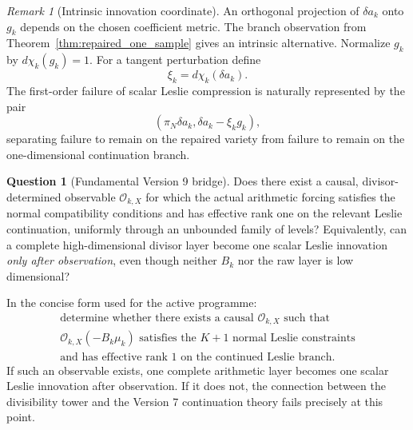\documentclass[11pt]{amsart}
\numberwithin{equation}{section}
\theoremstyle{plain}
\theoremstyle{definition}
\newtheorem{question}[theorem]{Question}
\theoremstyle{remark}
\newtheorem{remark}[theorem]{Remark}
\begin{document}
\begin{remark}[Intrinsic innovation coordinate]
\label{rem:v9_intrinsic_xi}
An orthogonal projection of $\delta a_k$ onto $g_k$ depends on the chosen coefficient metric.
The branch observation from Theorem~\ref{thm:repaired_one_sample} gives an intrinsic alternative.
Normalize $g_k$ by $d\chi_k(g_k)=1$.  For a tangent perturbation define
\begin{equation}
\boxed{\xi_k=d\chi_k(\delta a_k).}
\label{eq:v9_intrinsic_xi}
\end{equation}
The first-order failure of scalar Leslie compression is naturally represented by the pair
\begin{equation}
\boxed{
\left(
\pi_N\delta a_k,
\delta a_k-\xi_kg_k
\right),
}
\label{eq:v9_intrinsic_defect_pair}
\end{equation}
separating failure to remain on the repaired variety from failure to remain on the
one-dimensional continuation branch.
\end{remark}

\begin{question}[Fundamental Version 9 bridge]
\label{q:v9_fundamental_observable}
Does there exist a causal, divisor-determined observable $\mathcal O_{k,X}$ for which the actual
arithmetic forcing satisfies the normal compatibility conditions and has effective rank one on
the relevant Leslie continuation, uniformly through an unbounded family of levels?
Equivalently, can a complete high-dimensional divisor layer become one scalar Leslie innovation
\emph{only after observation}, even though neither $B_k$ nor the raw layer is low dimensional?

In the concise form used for the active programme:
\begin{equation}
\boxed{
\begin{gathered}
\text{determine whether there exists a causal }\mathcal O_{k,X}\text{ such that}\\
\mathcal O_{k,X}(-B_k\mu_k)
\text{ satisfies the }K+1\text{ normal Leslie constraints}\\
\text{and has effective rank }1\text{ on the continued Leslie branch.}
\end{gathered}
}
\label{eq:v9_fundamental_bridge_box}
\end{equation}
If such an observable exists, one complete arithmetic layer becomes one scalar Leslie
innovation after observation.  If it does not, the connection between the divisibility tower
and the Version 7 continuation theory fails precisely at this point.
\end{question}
\end{document}

